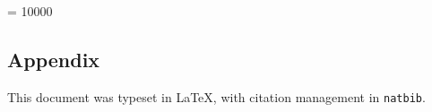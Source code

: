 \documentclass[oneside]{book}
\begin{document}
\clearpage
\interlinepenalty = 10000 %



\clearpage
{}

\begin{appendix}
\chapter*{Appendix}

This document was typeset in \LaTeX\cite{goossens1994latex}, 
with citation management in \texttt{natbib}\cite{daly1999natural}.
\vfill

\end{appendix}
\end{document}
